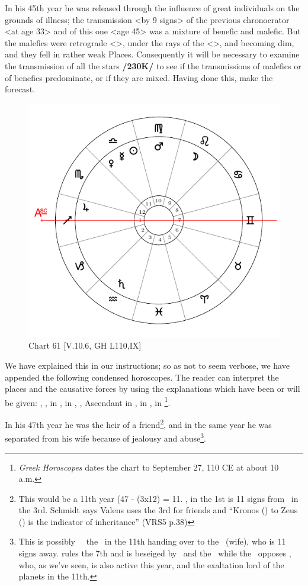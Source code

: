 In his 45th year he was released through the influence of great individuals on the grounds of illness; the transmission <by 9 signs> of the previous chronocrator <at age 33> and of this one <age 45> was a mixture of benefic and malefic. But the malefics were retrograde <\Saturn>, under the rays of the \Sun\xspace <\Mars>, and becoming dim, and they fell in rather weak Places.
Consequently it will be necessary to examine the transmission of all the stars \textbf{/230K/} to see if the transmissions of malefics or of benefics predominate, or if they are mixed. Having done this, make the forecast. 

\newpage
\begin{figure}
\centering
\includegraphics[width=.68\textwidth]{charts/5_10_06}
\caption{Chart 61 [V.10.6, GH L110,IX]}
\label{fig:chart61}
\end{figure}

\noindent We have explained this in our instructions; so as not to seem verbose, we have appended the following condensed horoscopes. The reader can interpret the places and the causative forces by using the explanations which have been or will be given: \Sun, \Mercury, \Venus \xspace in \Libra, \Saturn\xspace in \Aquarius, \Jupiter, Ascendant in \Sagittarius, \Mars\xspace in \Virgo, \Moon in \Leo\footnote{\textit{Greek Horoscopes} dates the chart to September 27, 110 CE at about 10 a.m.}. 

In his 47th year he was the heir of a friend\footnote{This would be a 11th year (47 - (3x12) = 11. \Jupiter, in the 1st is 11 signs from \Saturn\, in the 3rd. Schmidt says Valens uses the 3rd for friends and ``Kronos (\Saturn) to Zeus (\Jupiter) is the indicator of inheritance'' (VRS5 p.38)}, and in the same year he was separated from his wife because of jealousy and abuse\footnote{This is possibly \Venus\, \Mercury\, the \Sun\, in the 11th handing over to the \Moon\, (wife), who is 11 signs away. \Mercury rules the 7th and is beseiged by \Venus\, and the \Sun\, while the \Moon\, opposes \Saturn, who, as we've seen, is also active this year, and the exaltation lord of the planets in the 11th.}.

